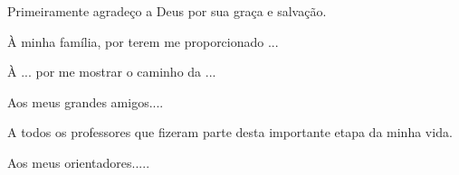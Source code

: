 \begin{agradecimentos}[AGRADECIMENTOS]
Primeiramente agradeço a Deus por sua graça e salvação.

À minha família, por terem me proporcionado ...

À ... por me mostrar o caminho da ...

Aos meus grandes amigos....

A todos os professores que fizeram parte desta importante etapa da minha vida.

Aos meus orientadores.....


\end{agradecimentos}

